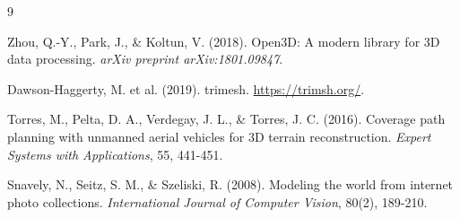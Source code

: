 \documentclass[11pt,a4paper]{article}
\begin{document}
\begin{thebibliography}{9}

 Zhou, Q.-Y., Park, J., \& Koltun, V. (2018). Open3D: A modern library for 3D data processing. \textit{arXiv preprint arXiv:1801.09847}.

 Dawson-Haggerty, M. et al. (2019). trimesh. \url{https://trimsh.org/}.

 Torres, M., Pelta, D. A., Verdegay, J. L., \& Torres, J. C. (2016). Coverage path planning with unmanned aerial vehicles for 3D terrain reconstruction. \textit{Expert Systems with Applications}, 55, 441-451.

 Snavely, N., Seitz, S. M., \& Szeliski, R. (2008). Modeling the world from internet photo collections. \textit{International Journal of Computer Vision}, 80(2), 189-210.

\end{thebibliography}
\end{document}
